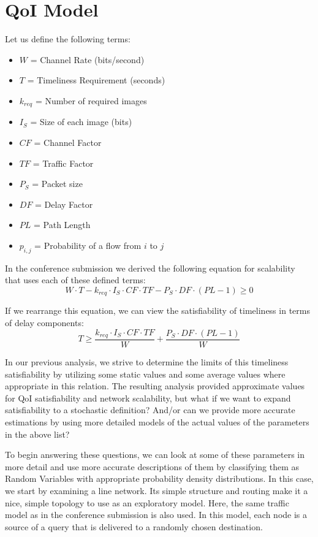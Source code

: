 \section{QoI Model}
\label{sec:qoi_model}

Let us define the following terms:

\begin{itemize}
  \item $W$ = Channel Rate (bits/second)
  \item $T$ = Timeliness Requirement (seconds)
  \item $k_{req}$ = Number of required images
  \item $I_S$ = Size of each image (bits)
  \item $CF$ = Channel Factor
  \item $TF$ = Traffic Factor
  \item $P_S$ = Packet size
  \item $DF$ = Delay Factor
  \item $PL$ = Path Length
  \item $p_{i,j}$ = Probability of a flow from $i$ to $j$
\end{itemize}

In the conference submission we derived the following equation for scalability that uses each of these defined terms:
\begin{equation}
	W \cdot T - k_{req} \cdot I_S \cdot CF \cdot TF - P_S \cdot DF \cdot (PL-1) \geq 0	
\end{equation}

If we rearrange this equation, we can view the satisfiability of timeliness in terms of delay components:
\begin{equation}
	T \geq \frac{ k_{req} \cdot I_S \cdot CF \cdot TF}{W} + \frac{P_S \cdot DF \cdot (PL-1)}{W}
\end{equation}

In our previous analysis, we strive to determine the limits of this timeliness satisfiability by utilizing some static values and some average values where appropriate in this relation.  The resulting analysis provided approximate values for QoI satisfiability and network scalability, but what if we want to expand satisfiability to a stochastic definition?  And/or can we provide more accurate estimations by using more detailed models of the actual values of the parameters in the above list? 

To begin answering these questions, we can look at some of these parameters in more detail and use more accurate descriptions of them by classifying them as Random Variables with appropriate probability density distributions.  In this case, we start by examining a line network.  Its simple structure and routing make it a nice, simple topology to use as an exploratory model.  Here, the same traffic model as in the conference submission is also used.  In this model, each node is a source of a query that is delivered to a randomly chosen destination.  

